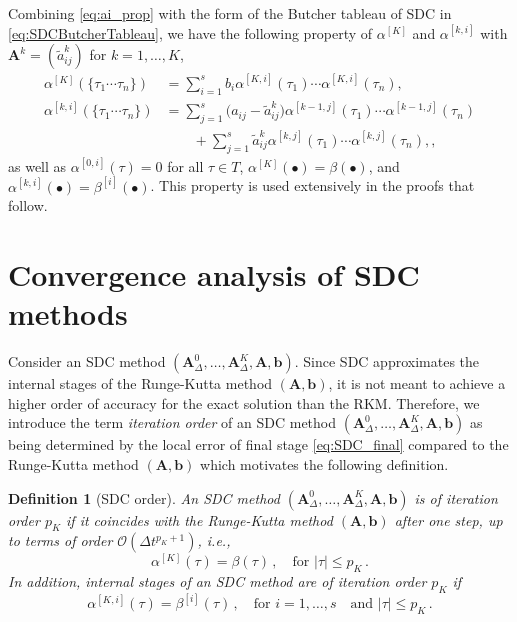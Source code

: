 \documentclass[sn-mathphys-num]{sn-jnl}%
\newcommand{\reva}[1]{#1}%
\newcommand{\revb}[1]{#1}%
\theoremstyle{thmstyleone}%
\theoremstyle{thmstyletwo}%
\theoremstyle{thmstylethree}%
\newtheorem{definition}{Definition}%
\begin{document}
Combining \eqref{eq:ai_prop} with the form of the Butcher tableau of SDC in \eqref{eq:SDCButcherTableau}, we have the following property of $\alpha^{[K]}$ and \reva{$\alpha^{[k,i]}$ with $\bm{A}^k = (\tilde{a}^k_{ij})$ for $k=1,\dots,K$},
\begin{align}
    \alpha^{[K]}(\{\tau_1 \cdots \tau_n\}) &= \sum_{i=1}^s b_i \reva{\alpha^{[K,i]}(\tau_1) \cdots \alpha^{[K,i]}(\tau_n)}, \nonumber \\
    \alpha^{[k,i]} (\{\tau_1 \cdots \tau_n\}) &= \sum_{j=1}^s \big( a_{ij} - \tilde{a}^k_{ij} \big) \reva{\alpha^{[k-1,j]}(\tau_1) \cdots \alpha^{[k-1,j]}(\tau_n)} \nonumber \\ 
                                              &\quad \quad + \sum_{j=1}^s \tilde{a}^k_{ij} \reva{\alpha^{[k,j]} (\tau_1) \cdots \alpha^{[k,j]} (\tau_n)},
    \label{eq:ai_prop_sdc} ,
\end{align}
\reva{as well as $\alpha^{[0,i]}(\tau) = 0$ for all $\tau \in T$, $\alpha^{[K]} (\bullet) = \beta(\bullet)$, and $\alpha^{[k,i]} (\bullet) = \beta^{[i]} (\bullet)$.}
This property is used extensively in the proofs that follow.

\section{Convergence analysis of SDC methods}\label{sec:results}

Consider an SDC method $(\bm{A}_{\Delta}^0, \ldots, \bm{A}_{\Delta}^K, \bm{A}, \bm{b})$.
Since SDC approximates the internal stages of the Runge-Kutta method $(\bm{A}, \bm{b})$, it is not meant to achieve a higher order of accuracy for the exact solution than the RKM.
\reva{Therefore, we introduce the term \emph{iteration order} of an SDC method $(\bm{A}_{\Delta}^0, \ldots, \bm{A}_{\Delta}^K, \bm{A}, \bm{b})$ as being determined} by the local error of final stage \eqref{eq:SDC_final} compared to the Runge-Kutta method $(\bm{A}, \bm{b})$ which motivates the following definition.
\begin{definition}[SDC order]
    \label{def:sdc_order}
    An SDC method $(\bm{A}_{\Delta}^0, \ldots, \bm{A}_{\Delta}^K, \bm{A}, \bm{b})$ is of \emph{\reva{iteration} order} $p_K$ if it coincides with the Runge-Kutta method $(\bm{A}, \bm{b})$ after one step, up to terms of order $\mathcal{O}(\Delta t^{p_K+1})$, i.e.,
    \[ \alpha^{[K]}(\tau) = \beta (\tau) \,, \quad \text{for } |\tau| \leq p_K \,. \]
    \revb{In addition, internal stages of an SDC method are of iteration order $p_K$ if
    \begin{equation} 
    \alpha^{[K,i]}(\tau) = \beta^{[i]} (\tau) \,, \quad \text{for } i = 1, \dots, s \quad \text{and } |\tau| \leq p_K \,.
    \end{equation} }
\end{definition}
\end{document}
